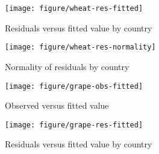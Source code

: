 \documentclass[nojss]{jss}\usepackage[]{graphicx}\usepackage[]{color}
\makeatletter
\def\maxwidth{ %
  \ifdim\Gin@nat@width>\linewidth
    \linewidth
  \else
    \Gin@nat@width
  \fi
}
\newenvironment{knitrout}{}{} %
\makeatother
\begin{document}
\begin{knitrout}
\color{fgcolor}\begin{figure}[!ht]


{\centering \texttt{[image: figure/wheat-res-fitted]} 

}

\caption[Residuals versus fitted value by country]{Residuals versus fitted value by country\label{fig:wheat-res-fitted}}
\end{figure}


\end{knitrout}


\begin{knitrout}
\color{fgcolor}\begin{figure}[!ht]


{\centering \texttt{[image: figure/wheat-res-normality]} 

}

\caption[Normality of residuals by country]{Normality of residuals by country\label{fig:wheat-res-normality}}
\end{figure}


\end{knitrout}



\begin{knitrout}
\color{fgcolor}\begin{figure}[!ht]


{\centering \texttt{[image: figure/grape-obs-fitted]} 

}

\caption[Observed versus fitted value]{Observed versus fitted value\label{fig:grape-obs-fitted}}
\end{figure}


\end{knitrout}



\begin{knitrout}
\color{fgcolor}\begin{figure}[!ht]


{\centering \texttt{[image: figure/grape-res-fitted]} 

}

\caption[Residuals versus fitted value by country]{Residuals versus fitted value by country\label{fig:grape-res-fitted}}
\end{figure}


\end{knitrout}
\end{document}
